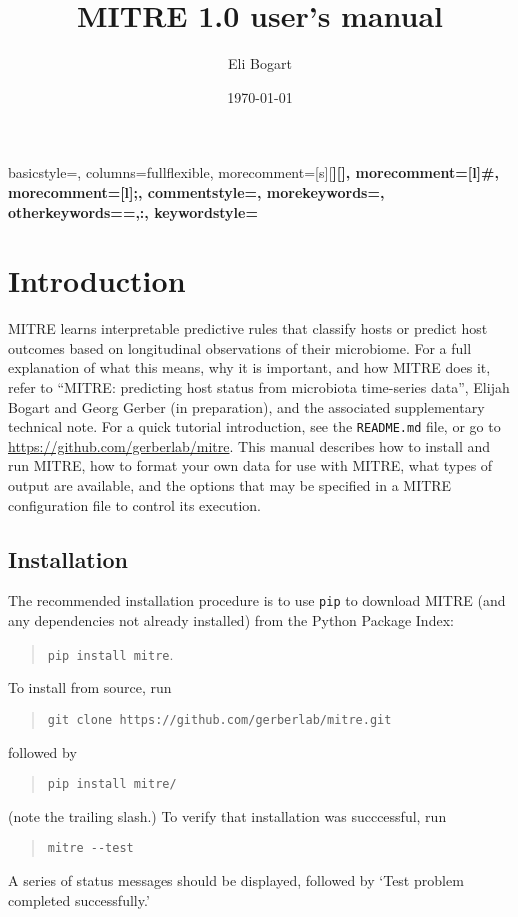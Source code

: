 \documentclass[12pt]{report}
\title{MITRE 1.0 user's manual}
\author{Eli Bogart}
\date{\today}
\begin{document}
\maketitle
\tableofcontents
{}
{
    basicstyle=\ttfamily\small,
    columns=fullflexible,
    morecomment=[s][\color{blue}\bfseries]{[}{]},
    morecomment=[l]{\#},
    morecomment=[l]{;},
    commentstyle=\color{gray}\ttfamily,
    morekeywords={},
    otherkeywords={=,:},
    keywordstyle={\bfseries}
}

\chapter{Introduction}

MITRE learns interpretable predictive rules that classify hosts or
predict host outcomes based on longitudinal observations of their
microbiome.  For a full explanation of what this means, why it is
important, and how MITRE does it, refer to ``MITRE: predicting host
status from microbiota time-series data'', Elijah Bogart and Georg
Gerber (in preparation), and the associated supplementary technical
note. For a quick tutorial introduction, see the \texttt{README.md}
file, or go to \url{https://github.com/gerberlab/mitre}.  This manual
describes how to install and run MITRE, how to format your own data
for use with MITRE, what types of output are available, and the
options that may be specified in a MITRE configuration file to control
its execution.

\section{Installation}
The recommended installation procedure is to use \texttt{pip} to
download MITRE (and any dependencies not already installed) from the
Python Package Index:
\begin{quote}
  \texttt{pip install mitre}.
\end{quote}
To install from
source, run
\begin{quote}
  \texttt{git clone https://github.com/gerberlab/mitre.git}
\end{quote}
followed by
\begin{quote}
  \texttt{pip install mitre/}
\end{quote}
(note the trailing slash.)  To
verify that installation was succcessful, run
\begin{quote}
  \texttt{mitre -{}-test}
\end{quote}
  A series of status messages should be displayed, followed by `Test
  problem completed successfully.'
\end{document}
